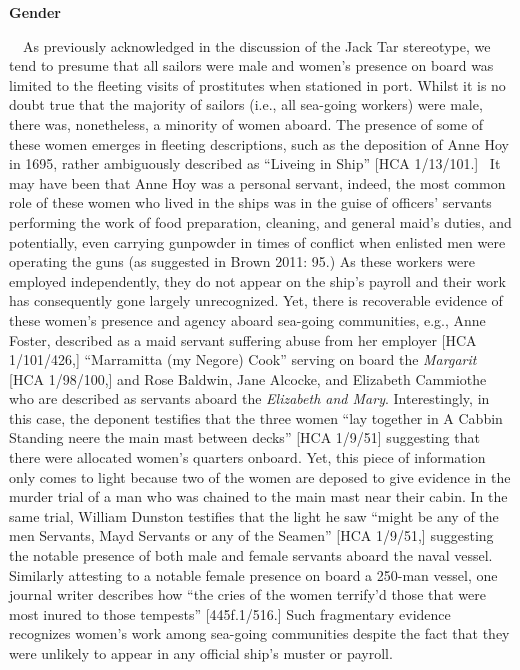 \setcounter{listWWNumxvleveli}{2}
\begin{listWWNumxvleveli}
\item 
\setcounter{listWWNumxvlevelii}{2}
\begin{listWWNumxvlevelii}
\item 
\begin{styleListParagraph}
\textbf{Gender}
\end{styleListParagraph}

\end{listWWNumxvlevelii}
\end{listWWNumxvleveli}
\begin{styleStandard}
\ \ As previously acknowledged in the discussion of the Jack Tar stereotype, we tend to presume that all sailors were male and women’s presence on board was limited to the fleeting visits of prostitutes when stationed in port. Whilst it is no doubt true that the majority of sailors (i.e., all sea-going workers) were male, there was, nonetheless, a minority of women aboard. The presence of some of these women emerges in fleeting descriptions, such as the deposition of Anne Hoy in 1695, rather ambiguously described as “Liveing in Ship” [HCA 1/13/101.] \ It may have been that Anne Hoy was a personal servant, indeed, the most common role of these women who lived in the ships was in the guise of officers’ servants performing the work of food preparation, cleaning, and general maid’s duties, and potentially, even carrying gunpowder in times of conflict when enlisted men were operating the guns (as suggested in Brown 2011: 95.) As these workers were employed independently, they do not appear on the ship’s payroll and their work has consequently gone largely unrecognized. Yet, there is recoverable evidence of these women’s presence and agency aboard sea-going communities, e.g., Anne Foster, described as a maid servant suffering abuse from her employer [HCA 1/101/426,] “Marramitta (my Negore) Cook” serving on board the \textit{Margarit} [HCA 1/98/100,] and Rose Baldwin, Jane Alcocke, and Elizabeth Cammiothe who are described as servants aboard the \textit{Elizabeth and Mary}. Interestingly, in this case, the deponent testifies that the three women “lay together in A Cabbin Standing neere the main mast between decks” [HCA 1/9/51] suggesting that there were allocated women’s quarters onboard. Yet, this piece of information only comes to light because two of the women are deposed to give evidence in the murder trial of a man who was chained to the main mast near their cabin. In the same trial, William Dunston testifies that the light he saw “might be any of the men Servants, Mayd Servants or any of the Seamen” [HCA 1/9/51,] suggesting the notable presence of both male and female servants aboard the naval vessel. Similarly attesting to a notable female presence on board a 250-man vessel, one journal writer describes how “the cries of the women terrify’d those that were most inured to those tempests” [445f.1/516.] Such fragmentary evidence recognizes women’s work among sea-going communities despite the fact that they were unlikely to appear in any official ship’s muster or payroll. 
\end{styleStandard}


